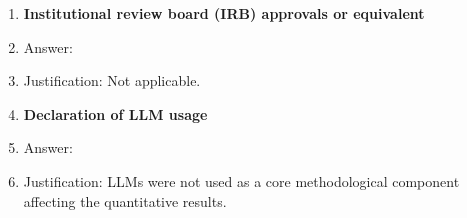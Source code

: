 \documentclass{article}
\begin{document}
\begin{enumerate}
\item {\bf Institutional review board (IRB) approvals or equivalent}
    \item[] Answer: \answerNA{}
    \item[] Justification: Not applicable.

\item {\bf Declaration of LLM usage}
    \item[] Answer: \answerNA{}
    \item[] Justification: LLMs were not used as a core methodological component affecting the quantitative results.

\end{enumerate}
\end{document}
